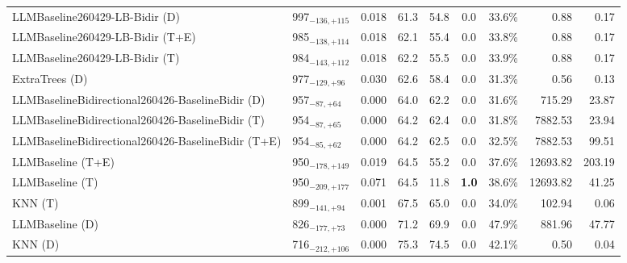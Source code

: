 \begin{tabular}{llcccccrr}
LLMBaseline260429-LB-Bidir (D) & 997${}_{-136,+115}$ & 0.018 & 61.3 & 54.8 & 0.0 & 33.6\% & 0.88 & 0.17 \\
LLMBaseline260429-LB-Bidir (T+E) & 985${}_{-138,+114}$ & 0.018 & 62.1 & 55.4 & 0.0 & 33.8\% & 0.88 & 0.17 \\
LLMBaseline260429-LB-Bidir (T) & 984${}_{-143,+112}$ & 0.018 & 62.2 & 55.5 & 0.0 & 33.9\% & 0.88 & 0.17 \\
ExtraTrees (D) & 977${}_{-129,+96}$ & 0.030 & 62.6 & 58.4 & 0.0 & 31.3\% & 0.56 & 0.13 \\
LLMBaselineBidirectional260426-BaselineBidir (D) & 957${}_{-87,+64}$ & 0.000 & 64.0 & 62.2 & 0.0 & 31.6\% & 715.29 & 23.87 \\
LLMBaselineBidirectional260426-BaselineBidir (T) & 954${}_{-87,+65}$ & 0.000 & 64.2 & 62.4 & 0.0 & 31.8\% & 7882.53 & 23.94 \\
LLMBaselineBidirectional260426-BaselineBidir (T+E) & 954${}_{-85,+62}$ & 0.000 & 64.2 & 62.5 & 0.0 & 32.5\% & 7882.53 & 99.51 \\
LLMBaseline (T+E) & 950${}_{-178,+149}$ & 0.019 & 64.5 & 55.2 & 0.0 & 37.6\% & 12693.82 & 203.19 \\
LLMBaseline (T) & 950${}_{-209,+177}$ & 0.071 & 64.5 & 11.8 & \textcolor{bronze}{\textbf{1.0}} & 38.6\% & 12693.82 & 41.25 \\
KNN (T) & 899${}_{-141,+94}$ & 0.001 & 67.5 & 65.0 & 0.0 & 34.0\% & 102.94 & 0.06 \\
LLMBaseline (D) & 826${}_{-177,+73}$ & 0.000 & 71.2 & 69.9 & 0.0 & 47.9\% & 881.96 & 47.77 \\
KNN (D) & 716${}_{-212,+106}$ & 0.000 & 75.3 & 74.5 & 0.0 & 42.1\% & 0.50 & 0.04 \\
\bottomrule
\end{tabular}